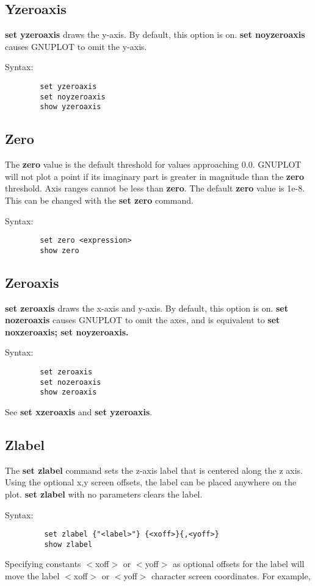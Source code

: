 \subsection{Yzeroaxis}
{\bf set yzeroaxis} draws the y-axis. By default, this option is on.
{\bf set noyzeroaxis} causes GNUPLOT to omit the y-axis.

Syntax:
\begin{verbatim}
        set yzeroaxis
        set noyzeroaxis
        show yzeroaxis
\end{verbatim}
\subsection{Zero}
The {\bf zero} value is the default threshold for values approaching 0.0.
GNUPLOT will not plot a point if its imaginary part is greater in
magnitude than the {\bf zero} threshold. Axis ranges cannot be less than
{\bf zero}. The default {\bf zero} value is 1e-8. This can be changed with
the {\bf set zero} command.

Syntax:
\begin{verbatim}
        set zero <expression>
        show zero
\end{verbatim}
\subsection{Zeroaxis}
{\bf set zeroaxis} draws the x-axis and y-axis. By default, this option is
on.  {\bf set nozeroaxis} causes GNUPLOT to omit the axes, and is
equivalent to {\bf set noxzeroaxis; set noyzeroaxis.}

Syntax:
\begin{verbatim}
        set zeroaxis
        set nozeroaxis
        show zeroaxis
\end{verbatim}
See {\bf set xzeroaxis} and {\bf set yzeroaxis}.
\subsection{Zlabel}
The {\bf set zlabel} command sets the z-axis label that is centered along
the z axis. Using the optional x,y screen offsets, the label can be
placed anywhere on the plot. {\bf set zlabel} with no parameters clears
the label.

Syntax: 
\begin{verbatim}
         set zlabel {"<label>"} {<xoff>}{,<yoff>}
         show zlabel
\end{verbatim}

Specifying constants $<$xoff$>$ or $<$yoff$>$ as optional offsets for the
label will move the label $<$xoff$>$ or $<$yoff$>$ character screen
coordinates. For example,

